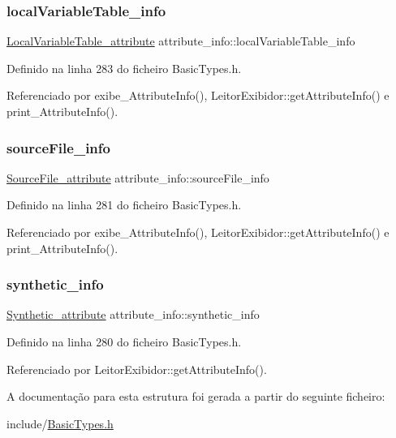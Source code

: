 \subsubsection{\texorpdfstring{local\+Variable\+Table\+\_\+info}{localVariableTable\_info}}
{\footnotesize\ttfamily \hyperlink{structLocalVariableTable__attribute}{Local\+Variable\+Table\+\_\+attribute} attribute\+\_\+info\+::local\+Variable\+Table\+\_\+info}



Definido na linha 283 do ficheiro Basic\+Types.\+h.



Referenciado por exibe\+\_\+\+Attribute\+Info(), Leitor\+Exibidor\+::get\+Attribute\+Info() e print\+\_\+\+Attribute\+Info().

\mbox{\label{structattribute__info_a92dad0fdd4730da884a5ee0f2fc181e7}} 
\subsubsection{\texorpdfstring{source\+File\+\_\+info}{sourceFile\_info}}
{\footnotesize\ttfamily \hyperlink{structSourceFile__attribute}{Source\+File\+\_\+attribute} attribute\+\_\+info\+::source\+File\+\_\+info}



Definido na linha 281 do ficheiro Basic\+Types.\+h.



Referenciado por exibe\+\_\+\+Attribute\+Info(), Leitor\+Exibidor\+::get\+Attribute\+Info() e print\+\_\+\+Attribute\+Info().

\mbox{\label{structattribute__info_a8a7080734144a95a2b2a0fc350fd235c}} 
\subsubsection{\texorpdfstring{synthetic\+\_\+info}{synthetic\_info}}
{\footnotesize\ttfamily \hyperlink{structSynthetic__attribute}{Synthetic\+\_\+attribute} attribute\+\_\+info\+::synthetic\+\_\+info}



Definido na linha 280 do ficheiro Basic\+Types.\+h.



Referenciado por Leitor\+Exibidor\+::get\+Attribute\+Info().



A documentação para esta estrutura foi gerada a partir do seguinte ficheiro\+:\begin{DoxyCompactItemize}
\item 
include/\hyperlink{BasicTypes_8h}{Basic\+Types.\+h}\end{DoxyCompactItemize}
